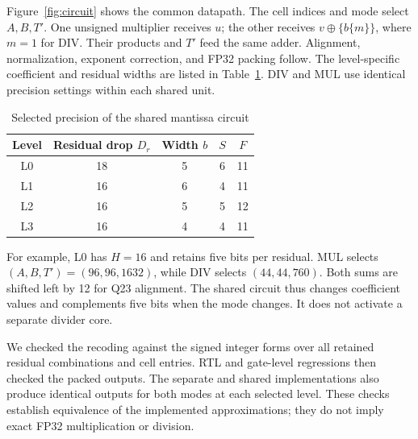 \documentclass[conference]{IEEEtran}
\begin{document}
Figure~\ref{fig:circuit} shows the common datapath.
The cell indices and mode select $A,B,T'$.
One unsigned multiplier receives $u$; the other receives
$v\oplus\{b\{m\}\}$, where $m=1$ for DIV.
Their products and $T'$ feed the same adder. Alignment, normalization,
exponent correction, and FP32 packing follow.
The level-specific coefficient and residual widths are listed in
Table~\ref{tab:precision}. DIV and MUL use identical precision settings
within each shared unit.

\begin{table}[t]
\centering
\caption{Selected precision of the shared mantissa circuit}
\label{tab:precision}
\begin{tabular}{ccccc}
\toprule
Level & Residual drop $D_r$ & Width $b$ & $S$ & $F$\\
\midrule
L0 & 18 & 5 & 6 & 11\\
L1 & 16 & 6 & 4 & 11\\
L2 & 16 & 5 & 5 & 12\\
L3 & 16 & 4 & 4 & 11\\
\bottomrule
\end{tabular}
\end{table}

For example, L0 has $H=16$ and retains five bits per residual.
MUL selects $(A,B,T')=(96,96,1632)$, while DIV selects
$(44,44,760)$. Both sums are shifted left by 12 for Q23 alignment.
The shared circuit thus changes coefficient values and complements five bits
when the mode changes. It does not activate a separate divider core.

We checked the recoding against the signed integer forms over all retained
residual combinations and cell entries. RTL and gate-level regressions then
checked the packed outputs. The separate and shared implementations also
produce identical outputs for both modes at each selected level. These
checks establish equivalence of the implemented approximations; they do not
imply exact FP32 multiplication or division.
\end{document}
